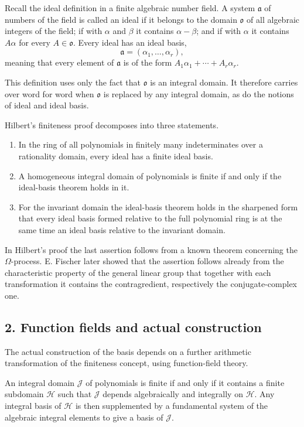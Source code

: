 \documentclass[11pt]{article}
\begin{document}
Recall the ideal definition in a finite algebraic number field. A system $\mathfrak a$ of numbers of the field is called an ideal if it belongs to the domain $\mathfrak o$ of all algebraic integers of the field; if with $\alpha$ and $\beta$ it contains $\alpha-\beta$; and if with $\alpha$ it contains $A\alpha$ for every $A\in\mathfrak o$. Every ideal has an ideal basis,
\[
  \mathfrak a=(\alpha_1,\ldots,\alpha_r),
\]
meaning that every element of $\mathfrak a$ is of the form $A_1\alpha_1+\cdots+A_r\alpha_r$.

This definition uses only the fact that $\mathfrak o$ is an integral domain. It therefore carries over word for word when $\mathfrak o$ is replaced by any integral domain, as do the notions of ideal and ideal basis.

Hilbert's finiteness proof decomposes into three statements.
\begin{enumerate}
  \item In the ring of all polynomials in finitely many indeterminates over a rationality domain, every ideal has a finite ideal basis.
  \item A homogeneous integral domain of polynomials is finite if and only if the ideal-basis theorem holds in it.
  \item For the invariant domain the ideal-basis theorem holds in the sharpened form that every ideal basis formed relative to the full polynomial ring is at the same time an ideal basis relative to the invariant domain.
\end{enumerate}
In Hilbert's proof the last assertion follows from a known theorem concerning the $\Omega$-process. E. Fischer later showed that the assertion follows already from the characteristic property of the general linear group that together with each transformation it contains the contragredient, respectively the conjugate-complex one.

\subsection{2. Function fields and actual construction}

The actual construction of the basis depends on a further arithmetic transformation of the finiteness concept, using function-field theory.

An integral domain $\mathcal J$ of polynomials is finite if and only if it contains a finite subdomain $\mathcal H$ such that $\mathcal J$ depends algebraically and integrally on $\mathcal H$. Any integral basis of $\mathcal H$ is then supplemented by a fundamental system of the algebraic integral elements to give a basis of $\mathcal J$.
\end{document}

